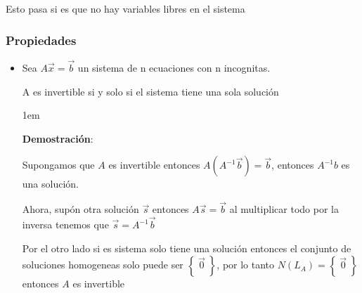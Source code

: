 \documentclass[12pt, fleqn]{report}                             %
\newenvironment{SmallIndentation}[1][0.75em]                    %
        {\begin{adjustwidth}{#1}{}\begin{footnotesize}}             %
        {\end{footnotesize}\end{adjustwidth}}                       %
\theoremstyle{break}                                            %
\newcommand{\Set}[1]    {\left\{ \; #1 \; \right\}}             %
\begin{document}
                Esto pasa si es que no hay variables libres en el sistema


                \vspace{1em}
                \subsubsection{Propiedades}

                    \begin{itemize}
                        \item 
                            Sea $A \vec x = \vec b$ un sistema de n ecuaciones
                            con n incognitas.

                            A es invertible si y solo si el sistema tiene una
                            sola solución

                            \begin{SmallIndentation}[1em]
                                \textbf{Demostración}:
                                
                                Supongamos que $A$ es invertible entonces
                                $A(A^{-1}\vec b) = \vec b$, entonces $A^{-1}b$
                                es una solución.

                                Ahora, supón otra solución $\vec s$
                                entonces $A \vec s = \vec b$ al multiplicar
                                todo por la inversa tenemos que $\vec s = A^{-1}\vec b$

                                Por el otro lado si es sistema solo tiene una solución
                                entonces el conjunto de soluciones homogeneas solo
                                puede ser $\Set{\vec 0}$, por lo tanto $N(L_A) = \Set{\vec 0}$
                                entonces $A$ es invertible
                            
                            \end{SmallIndentation}
                                

                    \end{itemize}


            \clearpage
\end{document}
